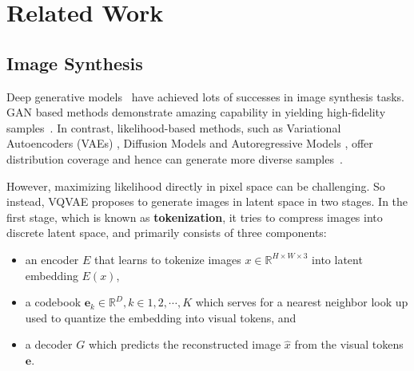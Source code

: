\section{Related Work}
\label{sec:related}
\subsection{Image Synthesis}\label{sec:related_synthesis}
Deep generative models~\cite{KingmaW14, Vahdat2020nvae, goodfellow2014generative, SAGAN, Song19generative,dhariwal2021diffusion,Oord16pixelcnn, Parmar18imagetransformer} have achieved lots of successes in image synthesis tasks. GAN based methods demonstrate amazing capability in yielding high-fidelity samples~\cite{goodfellow2014generative, biggan, Karras2019stylegan2, SAGAN, tseng2021regularizing}.
In contrast, likelihood-based methods, such as Variational Autoencoders (VAEs) \cite{KingmaW14, Vahdat2020nvae}, Diffusion Models \cite{Song19generative,dhariwal2021diffusion,ho2021cascaded} and Autoregressive Models \cite{Oord16pixelcnn, Parmar18imagetransformer}, offer distribution coverage and hence can generate more diverse samples~\cite{Song19generative, Vahdat2020nvae, Oord16pixelcnn}. 

However, maximizing likelihood directly in pixel space can be challenging. So instead,
VQVAE \cite{Oord17vqvae, Razavi19vqvae2} proposes to generate images in latent space in two stages. In the first stage, which is known as \textbf{tokenization}, it tries to compress images into discrete latent space, and primarily consists of three components:\vspace{-2.5mm}
\begin{itemize}
    \item an encoder $E$ that learns to tokenize images $x \in \mathbb{R}^{H\times W \times 3}$ into latent embedding $E(x)$, \vspace{-2.5mm}
    \item a codebook $\mathbf{e}_k \in \mathbb{R}^D, k\in 1, 2, \cdots, K$ which serves for a nearest neighbor look up used to quantize the embedding into visual tokens, and  \vspace{-2.5mm}
    \item a decoder $G$ which predicts the reconstructed image $\hat{x}$ from the visual tokens $\mathbf{e}$. 
\end{itemize}\vspace{-1mm}

